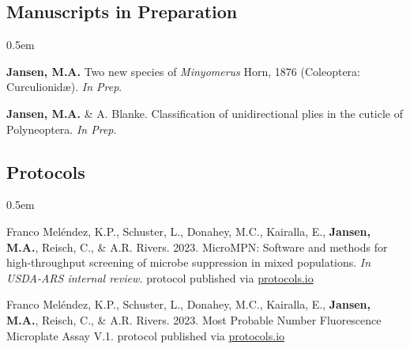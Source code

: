 \documentclass[12pt,a4paper]{article}
\begin{document}
	\subsection*{Manuscripts in Preparation}
		\begin{description}
			\itemsep0.5em
			\item \textbf{Jansen, M.A.} Two new species of \textit{Minyomerus} Horn, 1876 (Coleoptera: Curculionid\ae). \textit{In Prep}.
			\item \textbf{Jansen, M.A.} \& A. Blanke. Classification of unidirectional plies in the cuticle of Polyneoptera. \textit{In Prep}.
		\end{description}
	
	\subsection*{Protocols}
	\begin{description}
		\itemsep0.5em
		\item Franco Mel\'{e}ndez, K.P., Schuster, L., Donahey, M.C., Kairalla, E., \textbf{Jansen, M.A.}, Reisch, C., \& A.R. Rivers. 2023. MicroMPN: Software and methods for high-throughput screening of microbe suppression in mixed populations. \textit{In USDA-ARS internal review.} protocol published via \href{dx.doi.org/10.17504/protocols.io.81wgbymenvpk/v1}{protocols.io}
		\item Franco Mel\'{e}ndez, K.P., Schuster, L., Donahey, M.C., Kairalla, E., \textbf{Jansen, M.A.}, Reisch, C., \& A.R. Rivers. 2023. Most Probable Number Fluorescence Microplate Assay V.1. protocol published via \href{dx.doi.org/10.17504/protocols.io.q26g7yqk1gwz/v1}{protocols.io}
	\end{description}
\end{document}

